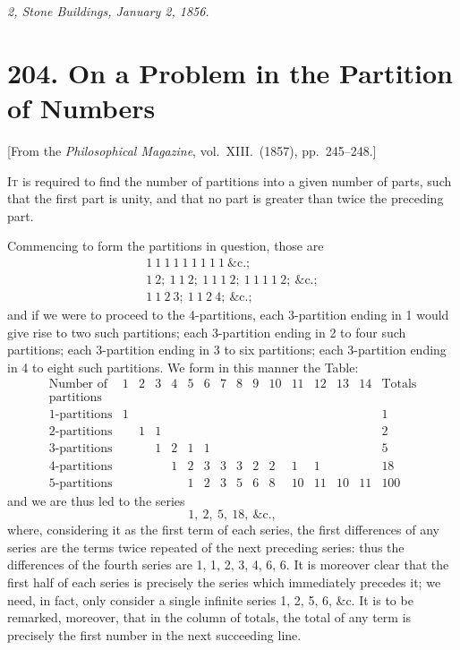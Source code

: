 \documentclass[12pt,a4paper]{article}
\theoremstyle{definition}
\begin{document}
\bigskip

\noindent\textit{2, Stone Buildings, January 2, 1856.}

\newpage


\section*{204. On a Problem in the Partition of Numbers}

\begin{center}
[From the \textit{Philosophical Magazine}, vol.~XIII.~(1857), pp.~245--248.]
\end{center}

\bigskip

I\textsc{t} is required to find the number of partitions into a given number of parts,
such that the first part is unity, and that no part is greater than twice the preceding
part.

Commencing to form the partitions in question, those are
\[
\begin{array}{l}
1\ 1\ 1\ 1\ 1\ 1\ 1\ 1\ 1\ \&\textrm{c}.;\\
1\ 2;\ 1\ 1\ 2;\ 1\ 1\ 1\ 2;\ 1\ 1\ 1\ 1\ 2;\ \&\textrm{c}.;\\
1\ 1\ 2\ 3;\ 1\ 1\ 2\ 4;\ \&\textrm{c}.;
\end{array}
\]
and if we were to proceed to the 4-partitions, each 3-partition ending in 1 would give
rise to two such partitions; each 3-partition ending in 2 to four such partitions; each
3-partition ending in 3 to six partitions; each 3-partition ending in 4 to eight
such partitions. We form in this manner the Table:
\[
\begin{array}{c|*{14}{c}|c}
\text{Number of} & 1 & 2 & 3 & 4 & 5 & 6 & 7 & 8 & 9 & 10 & 11 & 12 & 13 & 14 & \text{Totals}\\
\text{partitions} & & & & & & & & & & & & & & &\\
\hline
1\text{-partitions} & 1 & & & & & & & & & & & & & & 1\\
2\text{-partitions} & & 1 & 1 & & & & & & & & & & & & 2\\
3\text{-partitions} & & & 1 & 2 & 1 & 1 & & & & & & & & & 5\\
4\text{-partitions} & & & & 1 & 2 & 3 & 3 & 3 & 2 & 2 & 1 & 1 & & & 18\\
5\text{-partitions} & & & & & 1 & 2 & 3 & 5 & 6 & 8 & 10 & 11 & 10 & 11 & 100
\end{array}
\]
and we are thus led to the series
\[
1,\ 2,\ 5,\ 18,\ \&\textrm{c.},
\]
where, considering it as the first term of each series, the first differences of any series
are the terms twice repeated of the next preceding series: thus the differences of the
fourth series are 1, 1, 2, 3, 4, 6, 6. It is moreover clear that the first half of
each series is precisely the series which immediately precedes it; we need, in fact,
only consider a single infinite series 1, 2, 5, 6, \&c. It is to be remarked, moreover,
that in the column of totals, the total of any term is precisely the first number in
the next succeeding line.
\end{document}
